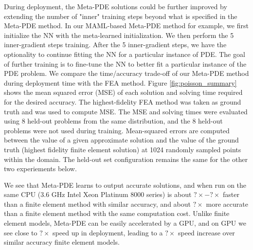 During deployment, the Meta-PDE solutions could be further improved by extending the number of "inner" training steps beyond what is specified in the Meta-PDE method. In our MAML-based Meta-PDE method for example, we first initialize the NN with the meta-learned initialization. We then perform the 5 inner-gradient steps training. After the 5 inner-gradient steps, we have the optionality to continue fitting the NN for a particular instance of PDE. The goal of further training is to fine-tune the NN to better fit a particular instance of the PDE problem. We compare the time/accuracy trade-off of our Meta-PDE method during deployment time with the FEA method. Figure \ref{fig:poisson_summary} shows the mean squared error (MSE) of each solution and solving time required for the desired accuracy. The highest-fidelity FEA method was taken as ground truth and was used to compute MSE. The MSE and solving times were evaluated using 8 held-out problems from the same distribution, and the 8 held-out problems were not used during training. Mean-squared errors are computed between the value of a given approximate solution and the value of the ground truth (highest fidelity finite element solution) at 1024 randomly sampled points within the domain. The held-out set configuration remains the same for the other two experiements below. 


We see that Meta-PDE learns to output accurate solutions, and when run on the same CPU (3.6 GHz Intel Xeon Platinum 8000 series) is about $?\times - ?\times$ faster than a finite element method with similar accuracy, and about $?\times$ more accurate than a finite element method with the same computation cost. Unlike finite element models, Meta-PDE can be easily accelerated by a GPU, and on GPU we see close to $?\times$ speed up in deployment, leading to a $?\times$ speed increase over similar accuracy finite element models.

